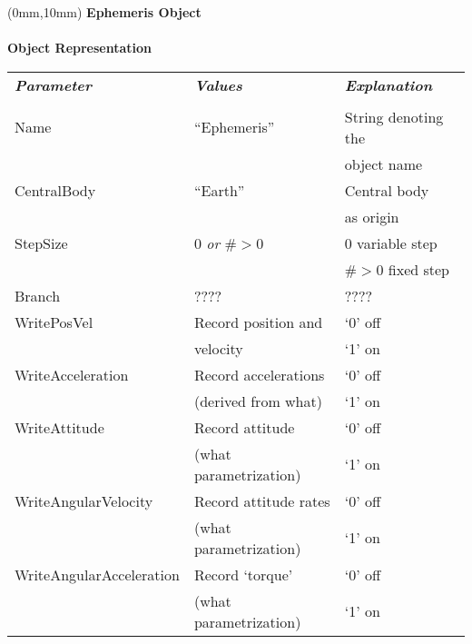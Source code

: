 \documentclass[10pt]{article}
\begin{document}
\TPMargin{1mm}
\begin{textblock*}{101.65mm}(0mm,10mm)
\normalsize \textbf{Ephemeris Object}\\
\scriptsize\\
\textbf{Object Representation}\\
\begin{tabular*}{97.15 mm}{|lll|}\hline
  \textbf{\emph{Parameter}} & \textbf{\emph{Values}} & \textbf{\emph{Explanation}}\\
                            &                        &                            \\
  Name                      & ``Ephemeris''          & String denoting the\\
                            &                        & object name\\
  CentralBody               & ``Earth''              & Central body\\
                            &                        & as origin\\
  StepSize                  & 0 \emph{or} $\# > 0$   & 0 variable step\\
                            &                        & $\# > 0$ fixed step\\
  Branch                    &  ????                  & ???? 		      \\
  WritePosVel               & Record position and    & `0' off   	      \\
                            & velocity               & `1' on\\ 
  WriteAcceleration         & Record accelerations   & `0' off	      \\
                            & (derived from what)    & `1' on\\ 
  WriteAttitude             & Record attitude        & `0' off				      \\
                            & (what parametrization) & `1' on\\ 
  WriteAngularVelocity      & Record attitude rates  & `0' off				      \\
                            & (what parametrization) & `1' on\\ 
  WriteAngularAcceleration  & Record `torque'        & `0' off			      \\
                            & (what parametrization) & `1' on\\ 

\end{tabular*}
\end{textblock*}
\end{document}
